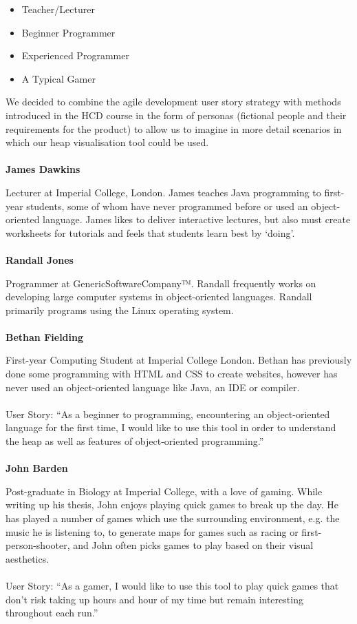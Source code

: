\documentclass[10pt, a4paper]{article}
\begin{document}
\begin{itemize}

  \item Teacher/Lecturer
  \item Beginner Programmer
  \item Experienced Programmer 
  \item A Typical Gamer 

\end{itemize}

We decided to combine the agile development user story strategy with methods introduced in the HCD course in the form of personas (fictional people and their requirements for the product) to allow us to imagine in more detail scenarios in which our heap visualisation tool could be used.
\\
\\ 
\textbf{James Dawkins} 

\noindent Lecturer at Imperial College, London. James teaches Java programming to first-year students, some of whom have never programmed before or used an object-oriented language. James likes to deliver interactive lectures, but also must create worksheets for tutorials and feels that students learn best by ‘doing’. 
\\
\\
\textbf{Randall Jones}

\noindent Programmer at GenericSoftwareCompany™. Randall frequently works on developing large computer systems in object-oriented languages. Randall primarily programs using the Linux operating system. 
\\
\\
\textbf{Bethan Fielding}

\noindent  First-year Computing Student at Imperial College London. Bethan has previously done some programming with HTML and CSS to create websites, however has never used an object-oriented language like Java, an IDE or compiler.
\\
\\
\noindent  User Story: “As a beginner to programming, encountering an object-oriented language for the first time, I would like to use this tool in order to understand the heap as well as features of object-oriented programming.”
\\
\\
\textbf{John Barden}

\noindent Post-graduate in Biology at Imperial College, with a love of gaming. While writing up his thesis, John enjoys playing quick games to break up the day. He has played a number of games which use the surrounding environment, e.g. the music he is listening to, to generate maps for games such as racing or first-person-shooter, and John often picks games to play based on their visual aesthetics.
\\
\\
\noindent User Story: “As a gamer, I would like to use this tool to play quick games that don’t risk taking up hours and hour of my time but remain interesting throughout each run.”
\\
\end{document}
